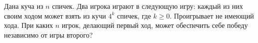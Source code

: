 \begin{problems}
\item
Дана куча из $n$ спичек.
Два игрока играют в следующую игру: каждый из них своим ходом может взять из
кучи $4^k$ спичек, где $k \geq 0$.
Проигрывает не имеющий хода.
При каких $n$ игрок, делающий первый ход, может обеспечить себе победу
независимо от игры второго?

\end{problems}

